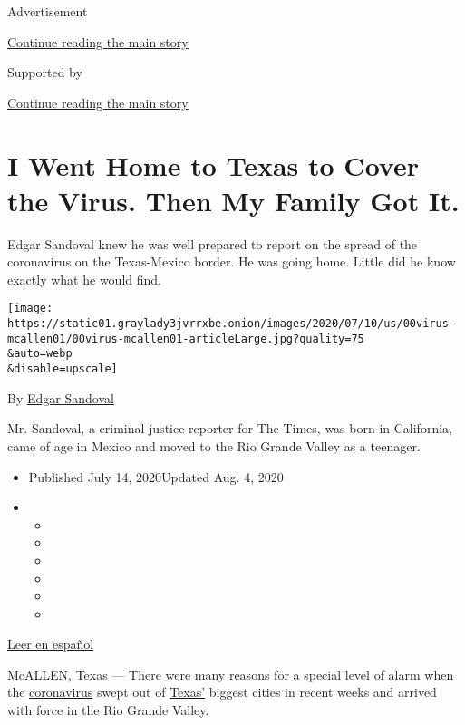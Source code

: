 Advertisement

\protect\hyperlink{after-top}{Continue reading the main story}

Supported by

\protect\hyperlink{after-sponsor}{Continue reading the main story}

\hypertarget{i-went-home-to-texas-to-cover-the-virus-then-my-family-got-it}{%
\section{I Went Home to Texas to Cover the Virus. Then My Family Got
It.}\label{i-went-home-to-texas-to-cover-the-virus-then-my-family-got-it}}

Edgar Sandoval knew he was well prepared to report on the spread of the
coronavirus on the Texas-Mexico border. He was going home. Little did he
know exactly what he would find.

\texttt{[image: https://static01.graylady3jvrrxbe.onion/images/2020/07/10/us/00virus-mcallen01/00virus-mcallen01-articleLarge.jpg?quality=75\\\&auto=webp\\\&disable=upscale]}

By \href{https://www.nytimes3xbfgragh.onion/by/edgar-sandoval}{Edgar
Sandoval}

Mr. Sandoval, a criminal justice reporter for The Times, was born in
California, came of age in Mexico and moved to the Rio Grande Valley as
a teenager.

\begin{itemize}
\item
  Published July 14, 2020Updated Aug. 4, 2020
\item
  \begin{itemize}
  \item
  \item
  \item
  \item
  \item
  \item
  \end{itemize}
\end{itemize}

\href{https://www.nytimes3xbfgragh.onion/es/2020/07/14/espanol/texas-coronavirus-rio-grande-valley.html}{Leer
en español}

McALLEN, Texas --- There were many reasons for a special level of alarm
when the
\href{https://www.nytimes3xbfgragh.onion/2020/08/04/us/texas-coronavirus-rio-grande-valley-starr-county.html}{coronavirus}
swept out of
\href{https://www.nytimes3xbfgragh.onion/2020/08/04/us/texas-coronavirus-rio-grande-valley-starr-county.html}{Texas'}
biggest cities in recent weeks and arrived with force in the Rio Grande
Valley.

